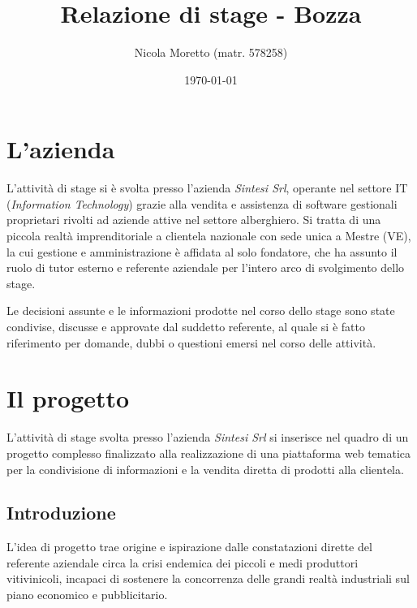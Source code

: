 \documentclass[11pt,a4paper,headsepline,hidelinks]{scrreprt} %
\def \azienda{\textit{Sintesi Srl}}
\begin{document}
    \title{Relazione di stage - Bozza}
    \author{Nicola Moretto (matr. 578258)}
    \date{\today}

    \maketitle

	\tableofcontents

	\listoffigures
	\begingroup
	\let\clearpage\relax
	\listoftables
	\endgroup


	\chapter{L'azienda}
	L'attività di stage si è svolta presso l'azienda \azienda{}, operante nel settore IT (\textit{Information Technology}) grazie alla vendita e assistenza di software gestionali proprietari rivolti ad aziende attive nel settore alberghiero. Si tratta di una piccola realtà imprenditoriale a clientela nazionale con sede unica a Mestre (VE), la cui gestione e amministrazione è affidata al solo fondatore, che ha assunto il ruolo di tutor esterno e referente aziendale per l'intero arco di svolgimento dello stage.

	Le decisioni assunte e le informazioni prodotte nel corso dello stage sono state condivise, discusse e approvate dal suddetto referente, al quale si è fatto riferimento per domande, dubbi o questioni emersi nel corso delle attività.

	\chapter{Il progetto}
	L'attività di stage svolta presso l'azienda \azienda{} si inserisce nel quadro di un progetto complesso finalizzato alla realizzazione di una piattaforma web tematica per la condivisione di informazioni e la vendita diretta di prodotti alla clientela.

	\section{Introduzione}
	L'idea di progetto trae origine e ispirazione dalle constatazioni dirette del referente aziendale circa la crisi endemica dei piccoli e medi produttori vitivinicoli, incapaci di sostenere la concorrenza delle grandi realtà industriali sul piano economico e pubblicitario.
\end{document}
